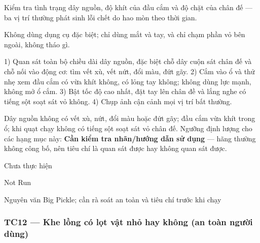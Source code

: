 \begin{description}
\tightlist
\item[Objective]
Kiểm tra tình trạng dây nguồn, độ khít của đầu cắm và độ chặt của chân đế --- ba vị trí thường phát sinh lỗi chết do hao mòn theo thời gian.
\item[Input]
Không dùng dụng cụ đặc biệt; chỉ dùng mắt và tay, và chỉ chạm phần vỏ bên ngoài, không tháo gì.
\item[Steps]
1) Quan sát toàn bộ chiều dài dây nguồn, đặc biệt chỗ dây cuộn sát chân đế và chỗ nối vào động cơ: tìm vết xù, vết nứt, đổi màu, đứt gãy. 2) Cắm vào ổ và thử nhẹ xem đầu cắm có vừa khít không, có lỏng tay không; không dùng lực mạnh, không mở ổ cắm. 3) Bật tốc độ cao nhất, đặt tay lên chân đề và lắng nghe có tiếng sột soạt sát vỏ không. 4) Chụp ảnh cận cảnh mọi vị trí bất thường.
\item[Expected]
Dây nguồn không có vết xù, nứt, đổi màu hoặc đứt gãy; đầu cắm vừa khít trong ổ; khi quạt chạy không có tiếng sột soạt sát vỏ chân đế. Ngưỡng định lượng cho các hạng mục này: \textbf{Cần kiểm tra nhãn/hướng dẫn sử dụng} --- hãng thường không công bố, nên tiêu chí là quan sát được hay không quan sát được.
\item[Actual]
Chưa thực hiện
\item[Verdict]
Not Run
\item[Ghi chú rà soát]
Nguyên văn Big Pickle; cần rà soát an toàn và tiêu chí trước khi chạy
\end{description}

\subsubsection{TC12 --- Khe lồng có lọt vật nhỏ hay không (an toàn người dùng)}\label{tc12-khe-lux1ed3ng-cuxf3-lux1ecdt-vux1eadt-nhux1ecf-hay-khuxf4ng-an-touxe0n-ngux1b0ux1eddi-duxf9ng}

